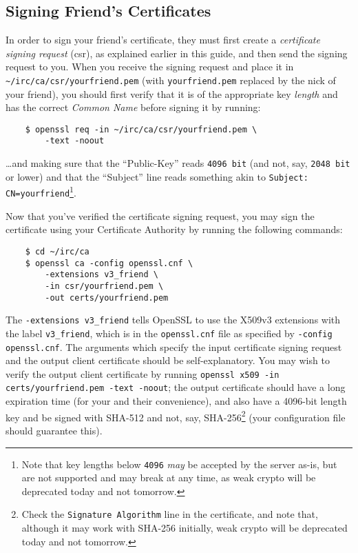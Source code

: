 \documentclass{article}
\begin{document}
{\subsection{Signing Friend's Certificates}
In order to sign your friend's certificate, they must first create a \textit{certificate signing request} (csr), as explained earlier in this guide, and then send the signing request to you.  When you receive the signing request and place it in \texttt{\textasciitilde /irc/ca/csr/yourfriend.pem} (with \texttt{yourfriend.pem} replaced by the nick of your friend), you should first verify that it is of the appropriate key \textit{length} and has the correct \textit{Common Name} before signing it by running:
\begin{lstlisting}
    $ openssl req -in ~/irc/ca/csr/yourfriend.pem \
        -text -noout
\end{lstlisting}
\ldots and making sure that the ``Public-Key'' reads \texttt{4096 bit} (and not, say, \texttt{2048 bit} or lower) and that the ``Subject'' line reads something akin to \texttt{Subject: CN=yourfriend}\footnote{Note that key lengths below \texttt{4096} \textit{may} be accepted by the server as-is, but are not supported and may break at any time, as weak crypto will be deprecated today and not tomorrow.}.

Now that you've verified the certificate signing request, you may sign the certificate using your Certificate Authority by running the following commands:
\begin{lstlisting}
    $ cd ~/irc/ca
    $ openssl ca -config openssl.cnf \
        -extensions v3_friend \
        -in csr/yourfriend.pem \
        -out certs/yourfriend.pem
\end{lstlisting}
The \texttt{-extensions v3\_friend} tells OpenSSL to use the X509v3 extensions with the label \texttt{v3\_friend}, which is in the \texttt{openssl.cnf} file as specified by \texttt{-config openssl.cnf}.  The arguments which specify the input certificate signing request and the output client certificate should be self-explanatory.  You may wish to verify the output client certificate by running \texttt{openssl x509 -in certs/yourfriend.pem -text -noout}; the output certificate should have a long expiration time (for your and their convenience), and also have a 4096-bit length key and be signed with SHA-512 and not, say, SHA-256\footnote{Check the \texttt{Signature Algorithm} line in the certificate, and note that, although it may work with SHA-256 initially, weak crypto will be deprecated today and not tomorrow.} (your configuration file should guarantee this).

}
\end{document}
